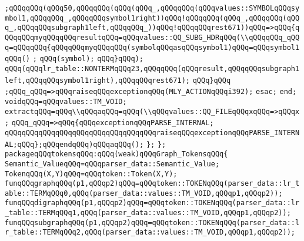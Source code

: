 \verb|;qQQqqQQq(qQQq50,qQQqqQQq(qQQq(qQQq_,qQQqqQQq(qQQqvalues::SYMBOLqQQqsymbol1,qQQqqQQq_,qQQqqQQqsymbol1right))qQQq!qQQqqQQq(qQQq_,qQQqqQQq(qQQq_,qQQqqQQqsubgraph1left,qQQqqQQq_))qQQq!qQQqqQQqrest671))qQQq=>qQQq{qQQqqQQqmyqQQqqQQqresultqQQq=qQQqvalues::QQ_SUBG_HDRqQQq(\\qQQqqQQq_qQQq=qQQqqQQq{qQQqqQQqmyqQQqqQQq(symbolqQQqasqQQqsymbol1)qQQq=qQQqsymbol1qQQq()|\newline
\verb|;|\newline
\verb|qQQq(symbol);|\newline
\verb|qQQq}qQQq);|\newline
\verb|qQQq(qQQqlr_table::NONTERMqQQq23,qQQqqQQq(qQQqresult,qQQqqQQqsubgraph1left,qQQqqQQqsymbol1right),qQQqqQQqrest671);|\newline
\verb|qQQq}qQQq|\newline
\verb|;qQQq_qQQq=>qQQqraiseqQQqexceptionqQQq(MLY_ACTIONqQQqi392);|\newline
\verb|esac;|\newline
\verb|end;|\newline
\verb|voidqQQq=qQQqvalues::TM_VOID;|\newline
\verb|extractqQQq=qQQq\\qQQqaqQQq=qQQq(\\qQQqvalues::QQ_FILEqQQqxqQQq=>qQQqx;|\newline
\verb|qQQq_qQQq=>qQQq{qQQqexceptionqQQqPARSE_INTERNAL;|\newline
\verb|qQQqqQQqqQQqqQQqqQQqqQQqqQQqqQQqqQQqraiseqQQqexceptionqQQqPARSE_INTERNAL;qQQq};qQQqendqQQq)qQQqaqQQq();|\newline
\verb|};|\newline
\verb|};|\newline
\verb|packageqQQqtokensqQQq:qQQq(weak)qQQqGraph_TokensqQQq{|\newline
\verb|Semantic_ValueqQQq=qQQqparser_data::Semantic_Value;|\newline
\verb|TokenqQQq(X,Y)qQQq=qQQqtoken::Token(X,Y);|\newline
\verb|funqQQqgraphqQQq(p1,qQQqp2)qQQq=qQQqtoken::TOKENqQQq(parser_data::lr_table::TERMqQQq0,qQQq(parser_data::values::TM_VOID,qQQqp1,qQQqp2));|\newline
\verb|funqQQqdigraphqQQq(p1,qQQqp2)qQQq=qQQqtoken::TOKENqQQq(parser_data::lr_table::TERMqQQq1,qQQq(parser_data::values::TM_VOID,qQQqp1,qQQqp2));|\newline
\verb|funqQQqsubgraphqQQq(p1,qQQqp2)qQQq=qQQqtoken::TOKENqQQq(parser_data::lr_table::TERMqQQq2,qQQq(parser_data::values::TM_VOID,qQQqp1,qQQqp2));|\newline
